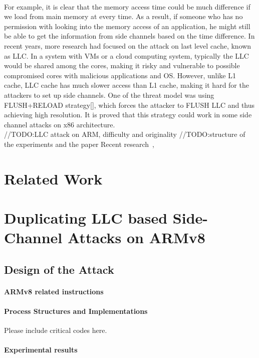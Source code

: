 \documentclass{sig-alternate}
\begin{document}
\\
\indent
For example, it is clear that the memory access time could be much difference if we load from main memory at every time. As a result, if someone who has no permission with looking into the memory access of an application, he might still be able to get the information from side channels based on the time difference. In recent years, more research had focused on the attack on last level cache, known as LLC. In a system with VMs or a cloud computing system, typically the LLC would be shared among the cores, making it risky and vulnerable to possible compromised cores with malicious applications and OS. However, unlike L1 cache, LLC cache has much slower access than L1 cache, making it hard for the attackers to set up side channels. One of the threat model was using FLUSH+RELOAD strategy[], which forces the attacker to FLUSH LLC and thus achieving high resolution. It is proved that this strategy could work in some side channel attacks on x86 architecture.
\\
\indent
//TODO:LLC attack on ARM, difficulty and originality
//TODO:structure of the experiments and the paper
Recent research~\cite{XuCuiPeinado2015},
\section{Related Work}

\section{Duplicating LLC based Side-Channel Attacks on ARMv8}

\subsection{Design of the Attack}

\paragraph{ARMv8 related instructions}

\paragraph{Process Structures and Implementations}

Please include critical codes here.

\paragraph{Experimental results}
\end{document}
